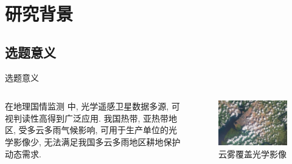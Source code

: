 \section{研究背景}

\subsection{选题意义}
\begin{frame}{选题意义}
    \begin{columns}
        在地理国情监测
        中, 光学遥感卫星数据多源, 可视判读性高得到广泛应用. 我国热带, 亚热带地区, 受多云多雨气候影响, 可用于生产单位的光学影像少, 无法满足我国多云多雨地区耕地保护动态需求.

        
        \begin{figure}
            \centering
            \includegraphics[width=\textwidth]{pic/chap0101.jpg}
            \caption{云雾覆盖光学影像}
            \label{fig:0101}
        \end{figure}
    \end{columns}
\end{frame}

